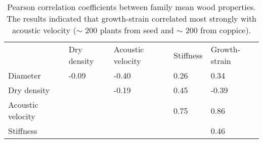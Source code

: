 \begin{table}
\centering
\caption{Pearson correlation coefficients between family mean wood properties. The results indicated that growth-strain correlated most strongly with acoustic velocity (\(\sim\) 200 plants from seed and \(\sim\) 200 from coppice).}
\label{my-label}
\begin{tabular}{lllll}
                  & Dry density       & Acoustic velocity & Stiffness & Growth-strain        \\
Diameter          & -0.09             & -0.40     & 0.26          & 0.34  \\
Dry density       &                   & -0.19     & 0.45          & -0.39 \\
Acoustic velocity &                   &           & 0.75          & 0.86  \\
Stiffness         &                   &           &               & 0.46 
\end{tabular}
\end{table}